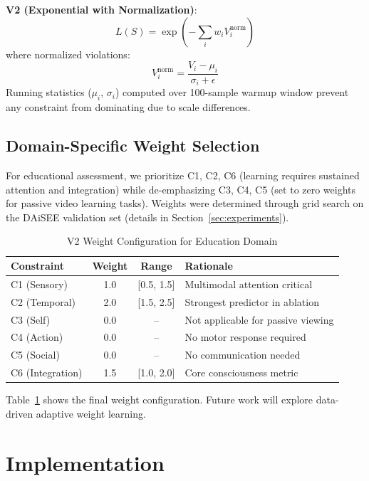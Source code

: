 \documentclass[10pt,journal,compsoc]{IEEEtran}
\begin{document}
\textbf{V2 (Exponential with Normalization)}:
\begin{equation}
L(S) = \exp\left(-\sum_i w_i V_i^{\text{norm}}\right)
\end{equation}
where normalized violations:
\begin{equation}
V_i^{\text{norm}} = \frac{V_i - \mu_i}{\sigma_i + \epsilon}
\end{equation}
Running statistics ($\mu_i$, $\sigma_i$) computed over 100-sample warmup window prevent any constraint from dominating due to scale differences.

\subsection{Domain-Specific Weight Selection}

For educational assessment, we prioritize C1, C2, C6 (learning requires sustained attention and integration) while de-emphasizing C3, C4, C5 (set to zero weights for passive video learning tasks). Weights were determined through grid search on the DAiSEE validation set (details in Section~\ref{sec:experiments}).

\begin{table}[!t]
\renewcommand{\arraystretch}{1.3}
\caption{V2 Weight Configuration for Education Domain}
\label{tab:weights}
\centering
\begin{tabular}{lccp{1.28in}}
\toprule
\textbf{Constraint} & \textbf{Weight} & \textbf{Range} & \textbf{Rationale} \\
\midrule
C1 (Sensory) & 1.0 & [0.5, 1.5] & Multimodal attention critical \\
C2 (Temporal) & 2.0 & [1.5, 2.5] & Strongest predictor in ablation \\
C3 (Self) & 0.0 & -- & Not applicable for passive viewing \\
C4 (Action) & 0.0 & -- & No motor response required \\
C5 (Social) & 0.0 & -- & No communication needed \\
C6 (Integration) & 1.5 & [1.0, 2.0] & Core consciousness metric \\
\bottomrule
\end{tabular}
\end{table}

Table~\ref{tab:weights} shows the final weight configuration. Future work will explore data-driven adaptive weight learning.

\section{Implementation}
\label{sec:implementation}
\end{document}
